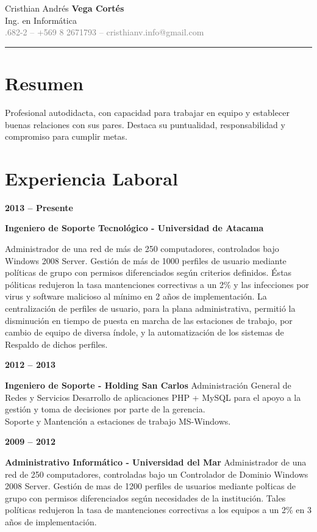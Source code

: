 \documentclass[letterpaper]{report}
\newenvironment{header}
{
    \begin{mdframed}
    [backgroundcolor=White,linecolor=white,linewidth=10pt]
        \begin{center}
}
{
        \end{center}
    \end{mdframed}
    \textcolor{OliveGreen}{\hrule}
}
\newcommand{\name}[2] {
    \LARGE{\textcolor{OliveGreen}{#1 \textbf{#2}}}
}
\newcommand{\resume}[1]{
    \begin{minipage}[t]{.2\linewidth}
		\hspace{1\linewidth}
    \end{minipage}
    \hspace{.02\linewidth}
    \begin{minipage}[t]{.8\linewidth}
        \normalsize#1
        \newline
    \end{minipage}
    \newline
    
}
\newcommand{\experience}[3]{
    \begin{minipage}[t]{.2\linewidth}
        \begin{flushright}
            \textbf{\normalsize#1}
        \end{flushright}
    \end{minipage}
    \hspace{.02\linewidth}
    \begin{minipage}[t]{.8\linewidth}
        \textbf{\normalsize#2}
        \newline
        {\normalsize#3}
        \newline
    \end{minipage}
    \newline
}
\newcommand{\contact}[3] {
    \normalsize{\textcolor{gray}{#1 -- #2 -- \ttfamily#3}}
}
\newcommand{\major}[1] {
    \large{#1}
}
\begin{document}
	\begin{header}
		\name{Cristhian Andr\'es}{Vega Cort\'es}\\
		\major{Ing. en Inform\'atica}\\
		\contact{.682-2}{\Mobilefone +569 8 2671793}{\Letter cristhianv.info@gmail.com}
    \end{header}  
    \section*{Resumen}
        \resume{Profesional autodidacta, con capacidad para trabajar en equipo y
			establecer buenas relaciones con sus pares. Destaca su
			puntualidad, responsabilidad y compromiso para cumplir metas.}	
    \section*{Experiencia Laboral}
        \experience{2013 -- Presente}{Ingeniero de Soporte Tecnol\'ogico - Universidad de Atacama}{
				
				Administrador de una red de m\'as de 250 computadores,
                controlados bajo Windows 2008 Server. Gesti\'on de
                m\'as de 1000 perfiles de usuario mediante pol\'iticas
                de grupo con permisos diferenciados seg\'un criterios
                definidos. Éstas póliticas redujeron la tasa
                mantenciones correctivas a un 2\% y las infecciones por
                virus y software malicioso al mínimo en 2 a\~nos de
                implementaci\'on. 
                La centralizaci\'on de perfiles de usuario,
                para la plana administrativa, permiti\'o la disminuci\'on en
                tiempo de puesta en marcha de las estaciones de trabajo,
                por cambio de equipo de diversa \'indole, y la
                automatizaci\'on de los sistemas de Respaldo de dichos
                perfiles.
            }            
        \experience{2012 -- 2013}{Ingeniero de Soporte - Holding San Carlos}{
				Administraci\'on General de Redes y Servicios
                Desarrollo de aplicaciones PHP + MySQL para el
                apoyo a la gesti\'on y toma de decisiones por
                parte de la gerencia.\\
                Soporte y Mantenci\'on a estaciones de trabajo 
                MS-Windows.
			}
        \experience{2009 -- 2012}{Administrativo Inform\'atico - Universidad del Mar}{
				Administrador de una red de 250 computadores, controladas
                bajo un Controlador de Dominio Windows 2008 Server. 
                Gesti\'on de mas de 1200 perfiles de usuarios mediante
                pol\'ticas de grupo con permisos diferenciados seg\'un
                necesidades de la instituci\'on. Tales pol\'iticas
                redujeron la tasa de mantenciones correctivas a los
                equipos a un 2\% en 3 a\~nos de implementaci\'on.
			}
\end{document}
